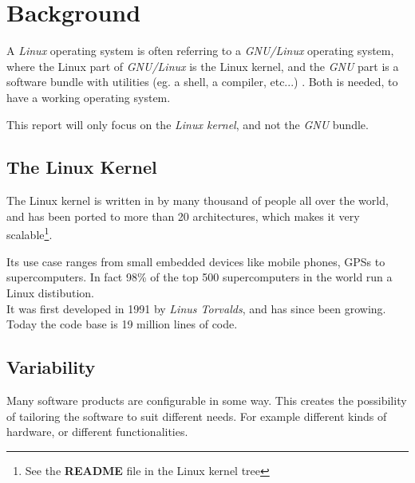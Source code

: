 \documentclass[a4paper,11pt]{report}
\begin{document}

\newpage
        \chapter{Background}

A \emph{Linux} operating system is often referring to a \emph{GNU/Linux} 
operating system, where the Linux part of \emph{GNU/Linux} is the Linux kernel, 
and the \emph{GNU} part is a software bundle with utilities (eg. a shell, a 
compiler, etc...) \cite{gnupack}. Both is 
needed, to have a working operating system. 

This report will only focus on the \emph{Linux kernel}, and not the \emph{GNU} 
bundle.


        \section{The Linux Kernel}
The Linux kernel is written in by many thousand of people all over 
the world, and has been ported to more than 20 architectures, which makes it 
very scalable\footnote
    {See the \textbf{README} file in the Linux kernel tree}.

Its use case ranges from small embedded devices like mobile phones, GPSs to 
supercomputers. In fact 98\% of the top 500 supercomputers in the world run a Linux 
distibution\cite
    {top500}.
\\

It was first developed in 1991 by \emph{Linus Torvalds}, and has since been 
growing. Today the code base is 19 million lines of code.


        \section{Variability}
Many software products are configurable in some way. This creates the 
possibility of tailoring the software to suit different needs. For example 
different kinds of hardware, or different functionalities. 
\\
\end{document}
